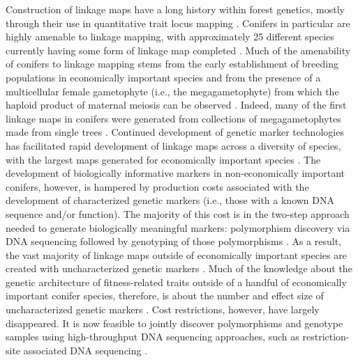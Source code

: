 \documentclass[11pt]{article}
\begin{document}
Construction of linkage maps have a long history within forest genetics, mostly through their use in quantitative trait locus 
mapping \citep{Ritland:2011}. Conifers in particular are highly amenable to linkage mapping, with approximately 25 different 
species currently having some form of linkage map completed \citep[see Table 5-1 in][]{Ritland:2011}. Much of the amenability of 
conifers to linkage mapping stems from the early establishment of breeding populations in economically important species and from 
the presence of a multicellular female gametophyte (i.e., the megagametophyte) from which the haploid product of maternal meiosis 
can be observed \citep{Cairney:2007}. Indeed, many of the first linkage maps in conifers were generated from collections of 
megagametophytes made from single trees \citep{Tulsieram:1992, Nelson:1993, Kubisiak:1996}. Continued development 
of genetic marker technologies has facilitated rapid development of linkage maps across a diversity of species, with the largest maps 
generated for economically important species \citep[e.g.][] {Achere:2004, Kang:2010, Martinez-Garcia:2013}. 
The development of biologically informative markers in non-economically important conifers, however, is hampered by production costs 
associated with the development of characterized  genetic markers (i.e., those with a known DNA sequence and/or function). 
The majority of this cost is in the two-step approach needed to generate biologically 
meaningful markers: polymorphism discovery via DNA sequencing followed by genotyping of those polymorphisms 
\citep[cf.][]{Eckert:2013a}. As a result, the vast majority of linkage maps outside of economically important 
species are created with uncharacterized genetic markers \citep[e.g.,][]{Travis:1998}. Much of the knowledge about the genetic 
architecture of fitness-related traits outside of a handful of economically important conifer species, therefore, is about the 
number and effect size of uncharacterized genetic markers \citep{Ritland:2011}. Cost restrictions, however, have largely disappeared. 
It is now feasible to jointly discover polymorphisms and genotype samples using high-throughput DNA sequencing 
approaches, such as restriction-site associated DNA sequencing \citep [RADseq; e.g.,][] {Peterson:2012}. 
\end{document}
